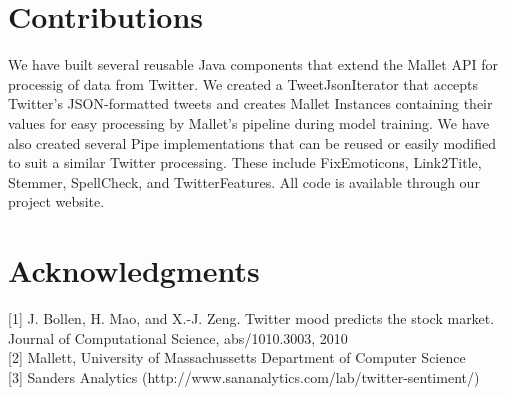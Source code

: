 \documentclass[letterpaper]{article}
\begin{document}
\section{Contributions}

We have built several reusable Java components that extend the Mallet API for processig of data from Twitter. We created a TweetJsonIterator that accepts Twitter's JSON-formatted tweets and creates Mallet Instances containing their values for easy processing by Mallet's pipeline during model training. We have also created several Pipe implementations that can be reused or easily modified to suit a similar Twitter processing. These include FixEmoticons, Link2Title, Stemmer, SpellCheck, and TwitterFeatures. All code is available through our project website.

\section{ Acknowledgments}

[1] J. Bollen, H. Mao, and X.-J. Zeng. Twitter mood predicts the
stock market. Journal of Computational Science,
abs/1010.3003, 2010\\

[2] Mallett, University of Massachussetts Department of Computer Science\\

[3] Sanders Analytics (http://www.sananalytics.com/lab/twitter-sentiment/)
\end{document}
